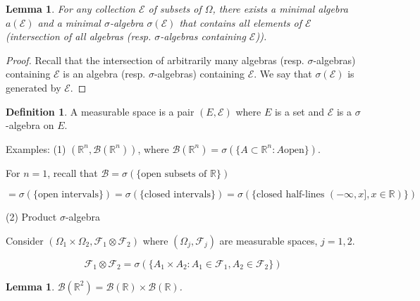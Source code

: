 \documentclass{article}
\numberwithin{equation}{section}
\newtheorem{lemma}[theorem]{Lemma}
\theoremstyle{definition}
\newtheorem{definition}{Definition}[section]
\newcommand{\R}{\mathbb{R}}
\newcommand{\mc}[1]{\mathcal{#1}}
\begin{document}
\begin{lemma}
    \label{le:3}
    For any collection $\mc{E}$ of subsets of $\Omega$, there exists a minimal algebra $a(\mc{E})$ and a minimal $\sigma$-algebra $\sigma(\mc{E})$ that contains all elements of $\mc{E}$ (intersection of all algebras (resp. $\sigma$-algebras containing $\mc{E}$)).
\end{lemma}

\begin{proof}
    Recall that the intersection of arbitrarily many algebras (resp. $\sigma$-algebras) containing $\mc{E}$ is an algebra (resp. $\sigma$-algebras) containing $\mc{E}$.
    We say that $\sigma(\mc{E})$ is generated by $\mc{E}$.
\end{proof}

\begin{definition}
    A measurable space is a pair $(E, \mc{E})$ where $E$ is a set and $\mc{E}$ is a $\sigma$-algebra on $E$.
\end{definition}

Examples:
(1) $(\R^n, \mc{B}(\R^n))$, where $\mc{B}(\R^n) = \sigma(\{A \subset \R^n: A \mathrm{ open}\})$.

For $n=1$, recall that $\mc{B} = \sigma(\{\text{open subsets of } \R\})$

\begin{equation}
    = \sigma(\{\text{open intervals}\}) = \sigma(\{\text{closed intervals}\}) = \sigma(\{\text{closed half-lines   } (-\infty,x], x \in \R)\}) 
\end{equation}

(2) Product $\sigma$-algebra

Consider $(\Omega_1 \times \Omega_2, \mc{F}_1 \otimes \mc{F}_2)$ where $(\Omega_j, \mc{F}_j)$ are measurable spaces, $j=1,2$.

\begin{equation}
    \mc{F}_1 \otimes \mc{F}_2 = \sigma(\{A_1 \times A_2 : A_1 \in \mc{F}_1, A_2 \in \mc{F}_2\})
\end{equation}

\begin{lemma}
    \label{le:4}
    $\mc{B}(\R^2) = \mc{B}(\R) \times \mc{B}(\R)$.
\end{lemma}
\end{document}
